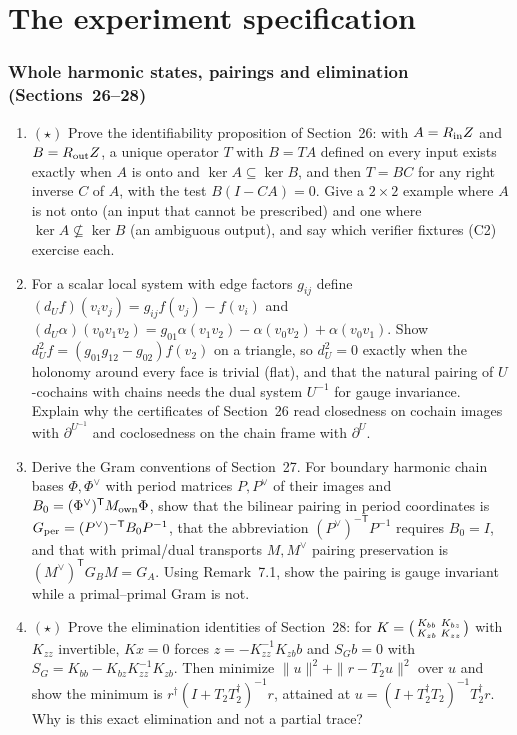 \documentclass[11pt]{article}
\begin{document}
\part*{The experiment specification}

\section{Whole harmonic states, pairings and elimination (Sections~26--28)}

\begin{enumerate}[label=\textbf{P\arabic*.},leftmargin=*,start=70]
\item $(\star)$ Prove the identifiability proposition of Section~26: with $A = R_{\rm in}Z$
  and $B = R_{\rm out}Z$, a unique operator $T$ with $B = TA$ defined on every
  input exists exactly when $A$ is onto and $\ker A\subseteq\ker B$, and then
  $T = BC$ for any right inverse $C$ of $A$, with the test $B(I-CA) = 0$.
  Give a $2\times2$ example where $A$ is not onto (an input that cannot be
  prescribed) and one where $\ker A\not\subseteq\ker B$ (an ambiguous output),
  and say which verifier fixtures (C2) exercise each.
\item For a scalar local system with edge factors $g_{ij}$ define
  $(d_Uf)(v_iv_j) = g_{ij}f(v_j)-f(v_i)$ and
  $(d_U\alpha)(v_0v_1v_2) = g_{01}\alpha(v_1v_2)-\alpha(v_0v_2)+\alpha(v_0v_1)$.
  Show $d_U^2f = (g_{01}g_{12}-g_{02})f(v_2)$ on a triangle, so $d_U^2 = 0$
  exactly when the holonomy around every face is trivial (flat), and that the
  natural pairing of $U$-cochains with chains needs the dual system $U^{-1}$
  for gauge invariance. Explain why the certificates of Section~26 read
  closedness on cochain images with $\partial^{U^{-1}}$ and coclosedness on the
  chain frame with $\partial^U$.
\item Derive the Gram conventions of Section~27. For boundary harmonic chain
  bases $\Phi,\Phi^\vee$ with period matrices $P,P^\vee$ of their images and
  $B_0 = (\Phi^\vee)^{\mathsf T}M_{\rm own}\Phi$, show that the bilinear pairing
  in period coordinates is $G_{\rm per} = (P^\vee)^{-\mathsf T}B_0P^{-1}$, that the
  abbreviation $(P^\vee)^{-\mathsf T}P^{-1}$ requires $B_0 = I$, and that with
  primal/dual transports $M,M^\vee$ pairing preservation is
  $(M^\vee)^{\mathsf T}G_BM = G_A$. Using Remark~7.1, show the pairing is gauge
  invariant while a primal--primal Gram is not.
\item $(\star)$ Prove the elimination identities of Section~28: for
  $K = \begin{psmallmatrix}K_{bb}&K_{bz}\\K_{zb}&K_{zz}\end{psmallmatrix}$ with
  $K_{zz}$ invertible, $Kx = 0$ forces $z = -K_{zz}^{-1}K_{zb}b$ and
  $S_Gb = 0$ with $S_G = K_{bb}-K_{bz}K_{zz}^{-1}K_{zb}$. Then minimize
  $\|u\|^2+\|r-T_2u\|^2$ over $u$ and show the minimum is
  $r^\dagger(I+T_2T_2^\dagger)^{-1}r$, attained at $u = (I+T_2^\dagger T_2)^{-1}T_2^\dagger r$.
  Why is this exact elimination and not a partial trace?
\end{enumerate}
\end{document}
